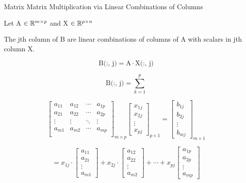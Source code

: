 \documentclass[12pt]{article}
\begin{document}
\begin{defin}{Matrix Matrix Multiplication via Linear Combinations of Columns}

    Let A $\in \mathbb{R}^{m \times p}$ and X $\in \mathbb{R}^{p \times n}$

    The jth column of B are linear combinations of columns of A with scalars in jth column X.

    \[ \text{B(:, j)} = \text{A} \cdot \text{X(:, j)}\]

    \[ \text{B(:, j)} = \sum_{k=1}^{p}\]

    \[
    \begin{bmatrix}
        a_{11} & a_{12} & \cdots & a_{1p} \\
        a_{21} & a_{22} & \cdots & a_{2p} \\
        \vdots & \vdots & \ddots & \vdots    \\
        a_{m1} & a_{m2} & \cdots & a_{mp} \\
    \end{bmatrix}_{m \times p}
    \begin{bmatrix}
        x_{1j} \\
        x_{2j} \\
        \vdots \\
        x_{pj}
    \end{bmatrix}_{p \times 1}
    =
    \begin{bmatrix}
        b_{1j} \\
        b_{2j} \\
        \vdots \\
        b_{mj}
    \end{bmatrix}_{m \times 1}
    \]

    \[
    =
    x_{1j} \cdot
    \begin{bmatrix}
        a_{11} \\ a_{21} \\ \vdots \\ a_{m1}
    \end{bmatrix}
    + x_{2j} \cdot
    \begin{bmatrix}
        a_{12} \\ a_{22} \\ \vdots \\ a_{m2}
    \end{bmatrix}
    + \cdots + x_{pj}
    \begin{bmatrix}
        a_{1p} \\ a_{2p} \\ \vdots \\ a_{mp}
    \end{bmatrix}
    \]
    
    
\end{defin}
\end{document}
